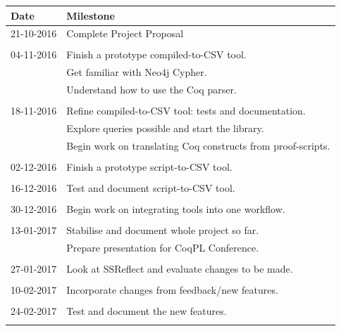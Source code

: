 \documentclass[12pt,a4paper]{article}
\begin{document}
\begin{table}[h]
\centering
\begin{tabular}{ll}
    \toprule

    Date & Milestone \\

    \midrule

	21-10-2016	&	Complete Project Proposal \\ \\
          
	04-11-2016	&	Finish a prototype compiled-to-CSV tool. \\ 
				&	Get familiar with Neo4j Cypher. \\
				&	Understand how to use the Coq parser. \\ \\

	18-11-2016	&	Refine compiled-to-CSV tool: tests and documentation. \\
				&	Explore queries possible and start the library. \\
				&	Begin work on translating Coq constructs from proof-scripts. \\ \\

    02-12-2016	&	Finish a prototype script-to-CSV tool. \\ \\

    16-12-2016	&	Test and document script-to-CSV tool. \\ \\

    30-12-2016	&	Begin work on integrating tools into one workflow. \\ \\

	13-01-2017	&	Stabilise and document whole project so far. \\
				&	Prepare presentation for CoqPL Conference. \\ \\

    27-01-2017	&	Look at SSReflect and evaluate changes to be made. \\ \\

    10-02-2017	&	Incorporate changes from feedback/new features. \\ \\

    24-02-2017	&	Test and document the new features. \\ \\


\end{tabular}
\end{table}
\end{document}
